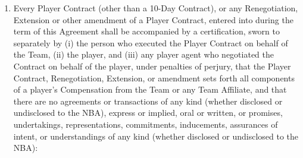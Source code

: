 \documentclass[
]{book}
\providecommand{\tightlist}{%
  \setlength{\itemsep}{0pt}\setlength{\parskip}{0pt}}
\begin{document}
\begin{enumerate}
\def\labelenumi{(\alph{enumi})}
\tightlist
\item
  Every Player Contract (other than a 10-Day Contract), or any Renegotiation, Extension or other amendment of a Player Contract, entered into during the term of this Agreement shall be accompanied by a certification, sworn to separately by (i) the person who executed the Player Contract on behalf of the Team, (ii) the player, and (iii) any player agent who negotiated the Contract on behalf of the player, under penalties of perjury, that the Player Contract, Renegotiation, Extension, or amendment sets forth all components of a player's Compensation from the Team or any Team Affiliate, and that there are no agreements or transactions of any kind (whether disclosed or undisclosed to the NBA), express or implied, oral or written, or promises, undertakings, representations, commitments, inducements, assurances of intent, or understandings of any kind (whether disclosed or undisclosed to the NBA):


\end{enumerate}
\end{document}
